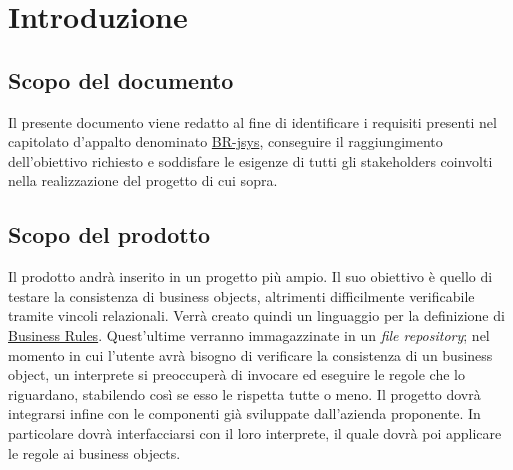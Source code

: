 \tableofcontents

\chapter{Introduzione}
\section{Scopo del documento}
Il presente documento viene redatto al fine di identificare i requisiti presenti nel capitolato d'appalto denominato \underline{BR-jsys}, conseguire il raggiungimento dell'obiettivo richiesto e soddisfare le esigenze di tutti gli stakeholders coinvolti nella realizzazione del progetto di cui sopra.
\section{Scopo del prodotto}
Il prodotto andr\`a inserito in un progetto pi\`u ampio. Il suo obiettivo \`e quello di testare la consistenza di business objects, altrimenti difficilmente verificabile tramite vincoli relazionali.
Verr\`a creato quindi un linguaggio per la definizione di \underline{Business Rules}. Quest'ultime verranno immagazzinate in un \textit{file repository}; nel momento in cui l'utente avr\`a bisogno di verificare la consistenza di un business object, un interprete si preoccuper\`a di invocare ed eseguire le regole che lo riguardano, stabilendo cos\`i se esso le rispetta tutte o meno.
Il progetto dovr\`a integrarsi infine con le componenti gi\`a sviluppate dall'azienda proponente. In particolare dovr\`a interfacciarsi con il loro interprete, il quale dovr\`a poi applicare le regole ai business objects.
